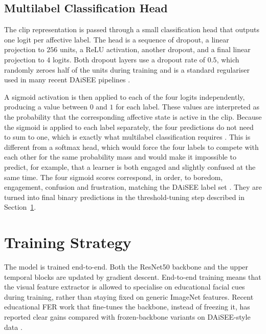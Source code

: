 \subsection{Multilabel Classification Head}\label{sec:method_head}

The clip representation is passed through a small classification head that outputs one logit per affective label. The head is a sequence of dropout, a linear projection to $256$ units, a ReLU activation, another dropout, and a final linear projection to $4$ logits. Both dropout layers use a dropout rate of $0.5$, which randomly zeroes half of the units during training and is a standard regulariser used in many recent DAiSEE pipelines \cite{asaju_adaptive_2022,shiri_detection_2024}.

A sigmoid activation is then applied to each of the four logits independently, producing a value between $0$ and $1$ for each label. These values are interpreted as the probability that the corresponding affective state is active in the clip. Because the sigmoid is applied to each label separately, the four predictions do not need to sum to one, which is exactly what multilabel classification requires \cite{rianto_engagement_2025}. This is different from a softmax head, which would force the four labels to compete with each other for the same probability mass and would make it impossible to predict, for example, that a learner is both engaged and slightly confused at the same time. The four sigmoid scores correspond, in order, to boredom, engagement, confusion and frustration, matching the DAiSEE label set \cite{gupta_daisee_2016}. They are turned into final binary predictions in the threshold-tuning step described in Section~\ref{sec:method_training}.

\section{Training Strategy}\label{sec:method_training}

The model is trained end-to-end. Both the ResNet50 backbone and the upper temporal blocks are updated by gradient descent. End-to-end training means that the visual feature extractor is allowed to specialise on educational facial cues during training, rather than staying fixed on generic ImageNet features. Recent educational FER work that fine-tunes the backbone, instead of freezing it, has reported clear gains compared with frozen-backbone variants on DAiSEE-style data \cite{abedi_improving_2021,gupta_edfa_2023,aly_revolutionizing_2025}.

